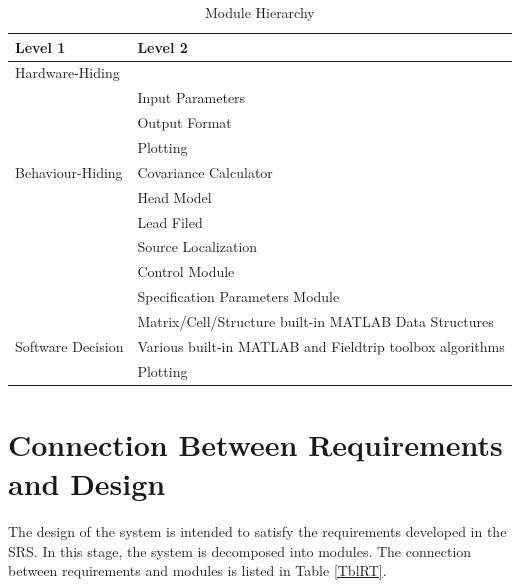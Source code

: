 \documentclass[12pt, titlepage]{article}
\begin{document}
\begin{table}[h!]
\centering
\begin{tabular}{p{} p{}}
\toprule
\textbf{Level 1} & \textbf{Level 2}\\
\midrule

{Hardware-Hiding} & ~ \\
\midrule

\multirow{7}{0.3\textwidth}{Behaviour-Hiding} & Input Parameters\\
& Output Format\\
& Plotting \\
& Covariance Calculator\\
& Head Model\\
& Lead Filed\\
& Source Localization\\ 
& Control Module\\
& Specification Parameters Module\\
\midrule

\multirow{3}{0.3\textwidth}{Software Decision} & {Matrix/Cell/Structure built-in MATLAB Data Structures}\\
& Various built-in MATLAB and Fieldtrip toolbox algorithms\\
& Plotting\\
\bottomrule

\end{tabular}
\caption{Module Hierarchy}
\label{TblMH}
\end{table}


\section{Connection Between Requirements and Design} \label{SecConnection}

The design of the system is intended to satisfy the requirements developed in
the SRS. In this stage, the system is decomposed into modules. The connection
between requirements and modules is listed in Table \ref{TblRT}.

\end{document}
